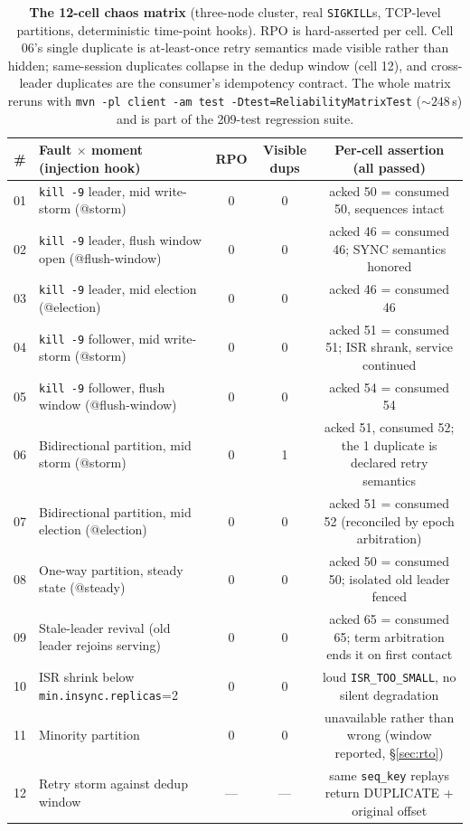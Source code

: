 \documentclass[letterpaper,twocolumn,10pt]{article}
\begin{document}
\begin{table}[t]
\centering
\small
\begin{tabular}{clccc}
\toprule
\# & Fault $\times$ moment (injection hook) & RPO & Visible dups &
Per-cell assertion (all passed) \\
\midrule
01 & \texttt{kill -9} leader, mid write-storm (@storm) & 0 & 0 &
  acked 50 = consumed 50, sequences intact \\
02 & \texttt{kill -9} leader, flush window open (@flush-window) & 0 & 0 &
  acked 46 = consumed 46; SYNC semantics honored \\
03 & \texttt{kill -9} leader, mid election (@election) & 0 & 0 &
  acked 46 = consumed 46 \\
04 & \texttt{kill -9} follower, mid write-storm (@storm) & 0 & 0 &
  acked 51 = consumed 51; ISR shrank, service continued \\
05 & \texttt{kill -9} follower, flush window (@flush-window) & 0 & 0 &
  acked 54 = consumed 54 \\
06 & Bidirectional partition, mid storm (@storm) & 0 & 1 &
  acked 51, consumed 52; the 1 duplicate is declared retry semantics \\
07 & Bidirectional partition, mid election (@election) & 0 & 0 &
  acked 51 = consumed 52 (reconciled by epoch arbitration) \\
08 & One-way partition, steady state (@steady) & 0 & 0 &
  acked 50 = consumed 50; isolated old leader fenced \\
09 & Stale-leader revival (old leader rejoins serving) & 0 & 0 &
  acked 65 = consumed 65; term arbitration ends it on first contact \\
10 & ISR shrink below \texttt{min.insync.replicas}=2 & 0 & 0 &
  loud \texttt{ISR\_TOO\_SMALL}, no silent degradation \\
11 & Minority partition & 0 & 0 &
  unavailable rather than wrong (window reported, \S\ref{sec:rto}) \\
12 & Retry storm against dedup window & --- & --- &
  same \texttt{seq\_key} replays return DUPLICATE + original offset \\
\bottomrule
\end{tabular}
\caption{\textbf{The 12-cell chaos matrix} (three-node cluster, real
\texttt{SIGKILL}s, TCP-level partitions, deterministic time-point
hooks). RPO is hard-asserted per cell. Cell 06's single duplicate is
at-least-once retry semantics made visible rather than hidden;
same-session duplicates collapse in the dedup window (cell 12), and
cross-leader duplicates are the consumer's idempotency contract. The
whole matrix reruns with \texttt{mvn -pl client -am test
-Dtest=ReliabilityMatrixTest} (${\sim}248$\,s) and is part of the
209-test regression suite.}
\label{tab:matrix}
\end{table}
\end{document}
